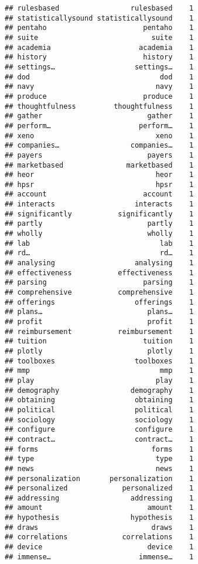\documentclass[]{article}
\begin{document}
\begin{verbatim}
## rulesbased                 rulesbased    1
## statisticallysound statisticallysound    1
## pentaho                       pentaho    1
## suite                           suite    1
## academia                     academia    1
## history                       history    1
## settings…                   settings…    1
## dod                               dod    1
## navy                             navy    1
## produce                       produce    1
## thoughtfulness         thoughtfulness    1
## gather                         gather    1
## perform…                     perform…    1
## xeno                             xeno    1
## companies…                 companies…    1
## payers                         payers    1
## marketbased               marketbased    1
## heor                             heor    1
## hpsr                             hpsr    1
## account                       account    1
## interacts                   interacts    1
## significantly           significantly    1
## partly                         partly    1
## wholly                         wholly    1
## lab                               lab    1
## rd…                               rd…    1
## analysing                   analysing    1
## effectiveness           effectiveness    1
## parsing                       parsing    1
## comprehensive           comprehensive    1
## offerings                   offerings    1
## plans…                         plans…    1
## profit                         profit    1
## reimbursement           reimbursement    1
## tuition                       tuition    1
## plotly                         plotly    1
## toolboxes                   toolboxes    1
## mmp                               mmp    1
## play                             play    1
## demography                 demography    1
## obtaining                   obtaining    1
## political                   political    1
## sociology                   sociology    1
## configure                   configure    1
## contract…                   contract…    1
## forms                           forms    1
## type                             type    1
## news                             news    1
## personalization       personalization    1
## personalized             personalized    1
## addressing                 addressing    1
## amount                         amount    1
## hypothesis                 hypothesis    1
## draws                           draws    1
## correlations             correlations    1
## device                         device    1
## immense…                     immense…    1

\end{verbatim}
\end{document}
